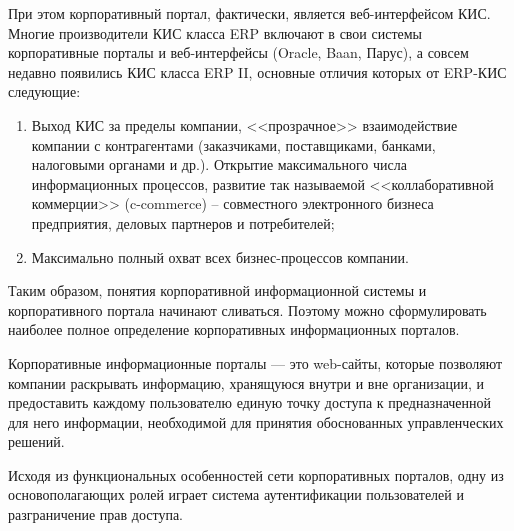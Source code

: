 При этом корпоративный портал, фактически, является веб-интерфейсом КИС. Многие
производители КИС класса ERP включают в свои системы корпоративные порталы и
веб-интерфейсы (Oracle, Baan, Парус), а совсем недавно появились КИС класса
ERP II, основные отличия которых от ERP-КИС следующие:
\begin{enumerate}
  \item Выход КИС за пределы компании, <<прозрачное>> взаимодействие компании с
контрагентами (заказчиками, поставщиками, банками, налоговыми органами и др.).
Открытие максимального числа информационных процессов, развитие так называемой
<<коллаборативной коммерции>> (c-commerce) -- совместного электронного бизнеса
предприятия, деловых партнеров и потребителей;
\item Максимально полный охват всех бизнес-процессов компании.
\end{enumerate}

Таким образом, понятия корпоративной информационной системы и корпоративного
портала начинают сливаться. Поэтому можно сформулировать наиболее полное
определение корпоративных информационных порталов.

Корпоративные информационные порталы --- это web-сайты, которые позволяют
компании раскрывать информацию, хранящуюся внутри и вне организации, и предоставить
каждому пользователю единую точку доступа к предназначенной для него информации,
необходимой для принятия обоснованных управленческих решений.~\cite{opred_kis}

Исходя из функциональных особенностей сети корпоративных порталов, одну из
основополагающих ролей играет система аутентификации пользователей и
разграничение прав доступа.

